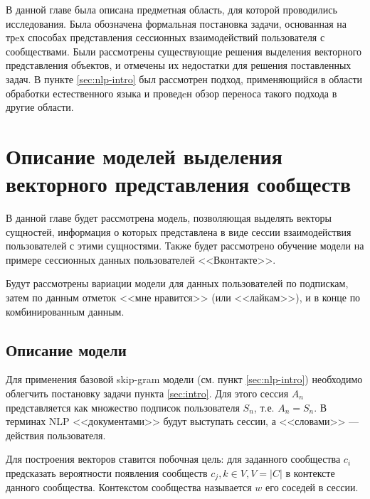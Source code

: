 \documentclass[times,specification,annotation]{itmo-student-thesis}
\begin{document}
\chapterconclusion

В данной главе была описана предметная область, для которой проводились исследования. Была обозначена формальная постановка задачи, основанная на трeх способах представления сессионных взаимодействий пользователя с сообществами. Были рассмотрены существующие решения выделения векторного представления объектов, и отмечены их недостатки для решения поставленных задач. В пункте \ref{sec:nlp-intro} был рассмотрен подход, применяющийся в области обработки естественного языка и проведeн обзор переноса такого подхода в другие области.   

\finishrelatedwork

\chapter{Описание моделей выделения векторного представления сообществ}

В данной главе будет рассмотрена модель, позволяющая выделять векторы
сущностей, информация о которых представлена в виде сессии взаимодействия
пользователей с этими сущностями.
Также будет рассмотрено обучение модели на примере сессионных данных пользователей <<Вконтакте>>. 

Будут рассмотрены вариации модели для данных пользователей по подпискам, затем по данным отметок <<мне нравится>> (или <<лайкам>>), и в конце по комбинированным данным.

\section{Описание модели}\label{sec:algo}

Для применения базовой skip-gram \cite{mikolov2013distributed} модели (см. пункт \ref{sec:nlp-intro}) необходимо облегчить постановку задачи пункта \ref{sec:intro}. Для этого сессия $A_n$ представляется как множество подписок пользователя $S_n$, т.е. $A_n = S_n$. В терминах NLP <<документами>> будут выступать сессии, а <<словами>> --- действия пользователя.

Для построения векторов ставится побочная цель: для заданного сообщества $c_i$ предсказать вероятности появления сообществ $c_j, k \in V, V = |C|$ в контексте данного сообщества. Контекстом сообщества называется $w$ его соседей в сессии. 
\end{document}

